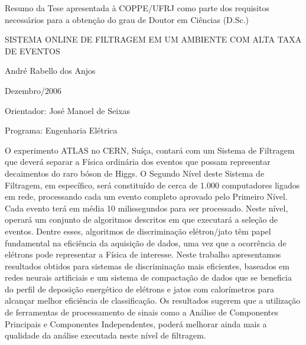 \newenvironment{summary}[1]{%
\begin{minipage}{\linewidth}%
\newcommand{\saveparameter}{\baselinestretch}%
\renewcommand{\baselinestretch}{#1}%
\normalsize}%
{%
\renewcommand{\baselinestretch}{\saveparameter}%
\end{minipage}%
}

\noindent
Resumo da Tese apresentada à COPPE/UFRJ como parte dos requisitos necessários
para a obtenção do grau de Doutor em Ciências (D.Sc.)

\vspace{1.5cm}

\begin{center}
SISTEMA ONLINE DE FILTRAGEM EM UM AMBIENTE COM ALTA TAXA DE EVENTOS
\vspace{1cm}

André Rabello dos Anjos
\vspace{1cm}

Dezembro/2006
\end{center}
\vspace{1.5cm}

\noindent
Orientador: José Manoel de Seixas
\vspace{1.5cm}

\noindent
Programa: Engenharia Elétrica
\vspace{2cm}

\begin{summary}{1.2}
\hspace{0.8cm}O experimento ATLAS no CERN, Suíça, contará com um Sistema de
Filtragem que deverá separar a Física ordinária dos eventos que possam
representar decaimentos do raro bóson de Higgs. O Segundo Nível deste Sistema
de Filtragem, em específico, será constituído de cerca de 1.000 computadores
ligados em rede, processando cada um evento completo aprovado pelo Primeiro
Nível. Cada evento terá em média 10 milissegundos para ser processado.  Neste
nível, operará um conjunto de algoritmos descritos em  que
executará a seleção de eventos. Dentre esses, algoritmos de discriminação
elétron/jato têm papel fundamental na eficiência da aquisição de dados, uma
vez que a ocorrência de elétrons pode representar a Física de interesse. Neste
trabalho apresentamos resultados obtidos para sistemas de discriminação mais
eficientes, baseados em redes neurais artificiais e um sistema de compactação
de dados que se beneficia do perfil de deposição energético de elétrons e
jatos com calorímetros para alcançar melhor eficiência de classificação. Os
resultados sugerem que a utilização de ferramentas de processamento de sinais
como a Análise de Componentes Principais e Componentes Independentes, poderá
melhorar ainda mais a qualidade da análise executada neste nível de filtragem.
\end{summary}

